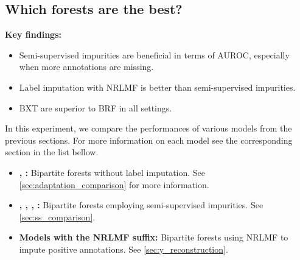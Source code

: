 \subsection{Which forests are the best?}
\label{sec:best_forests}

\begin{mdframed}
    \textbf{Key findings:}
    \begin{itemize}
        \item Semi-supervised impurities are beneficial in terms of AUROC, especially when more annotations are missing.  %
        \item Label imputation with NRLMF is better than semi-supervised impurities.
        \item BXT are superior to BRF in all settings.
    \end{itemize}
\end{mdframed}

In this experiment, we compare the performances of various models from the previous sections. For more information on each model see the corresponding section in the list bellow.

\begin{itemize}
    \item \textbf{, :}
    Bipartite forests without label imputation.
    See \autoref{sec:adaptation_comparison} for more information.
    \item \textbf{, , , :}
    Bipartite forests employing semi-supervised impurities.
    See \autoref{sec:ss_comparison}.
    \item \textbf{Models with the NRLMF suffix:} 
    Bipartite forests using NRLMF to impute positive annotations.
    See \autoref{sec:y_reconstruction}.
\end{itemize}



